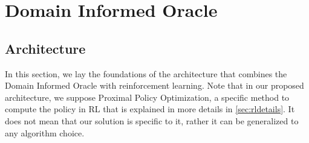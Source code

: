 \section{Domain Informed Oracle} 
\subsection{Architecture}
In this section, we lay the foundations of the architecture that combines the Domain Informed Oracle with 
reinforcement learning. Note that in our proposed architecture, we suppose Proximal Policy Optimization, a specific method to compute the policy in RL that is explained in more details in \ref{sec:rldetails}. 
It does not mean that our solution is specific to it, rather it can be generalized to any algorithm choice.

\medskip 

